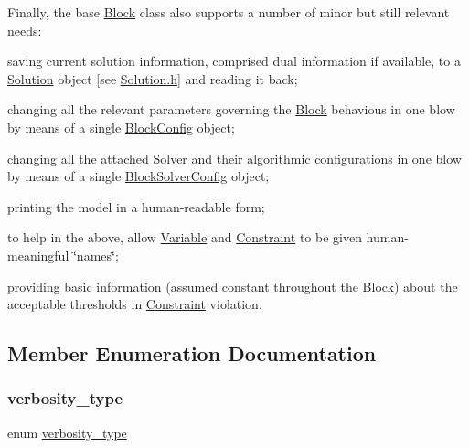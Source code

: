 Finally, the base \mbox{\hyperlink{class_s_m_spp__di__unipi__it_1_1_block}{Block}} class also supports a number of minor but still relevant needs\+:


\begin{DoxyItemize}
\item saving current solution information, comprised dual information if available, to a \mbox{\hyperlink{class_s_m_spp__di__unipi__it_1_1_solution}{Solution}} object \mbox{[}see \mbox{\hyperlink{_solution_8h}{Solution.\+h}}\mbox{]} and reading it back;
\item changing all the relevant parameters governing the \mbox{\hyperlink{class_s_m_spp__di__unipi__it_1_1_block}{Block}} behavious in one blow by means of a single \mbox{\hyperlink{class_s_m_spp__di__unipi__it_1_1_block_config}{Block\+Config}} object;
\item changing all the attached \mbox{\hyperlink{class_s_m_spp__di__unipi__it_1_1_solver}{Solver}} and their algorithmic configurations in one blow by means of a single \mbox{\hyperlink{class_s_m_spp__di__unipi__it_1_1_block_solver_config}{Block\+Solver\+Config}} object;
\item printing the model in a human-\/readable form;
\item to help in the above, allow \mbox{\hyperlink{class_s_m_spp__di__unipi__it_1_1_variable}{Variable}} and \mbox{\hyperlink{class_s_m_spp__di__unipi__it_1_1_constraint}{Constraint}} to be given human-\/meaningful \char`\"{}names\char`\"{};
\item providing basic information (assumed constant throughout the \mbox{\hyperlink{class_s_m_spp__di__unipi__it_1_1_block}{Block}}) about the acceptable thresholds in \mbox{\hyperlink{class_s_m_spp__di__unipi__it_1_1_constraint}{Constraint}} violation. 
\end{DoxyItemize}

\subsection{Member Enumeration Documentation}
\mbox{\label{class_s_m_spp__di__unipi__it_1_1_block_aae1eff6b4e72eef08cf2d8334500f9b6}} 
\subsubsection{\texorpdfstring{verbosity\+\_\+type}{verbosity\_type}}
{\footnotesize\ttfamily enum \mbox{\hyperlink{class_s_m_spp__di__unipi__it_1_1_block_aae1eff6b4e72eef08cf2d8334500f9b6}{verbosity\+\_\+type}}}



